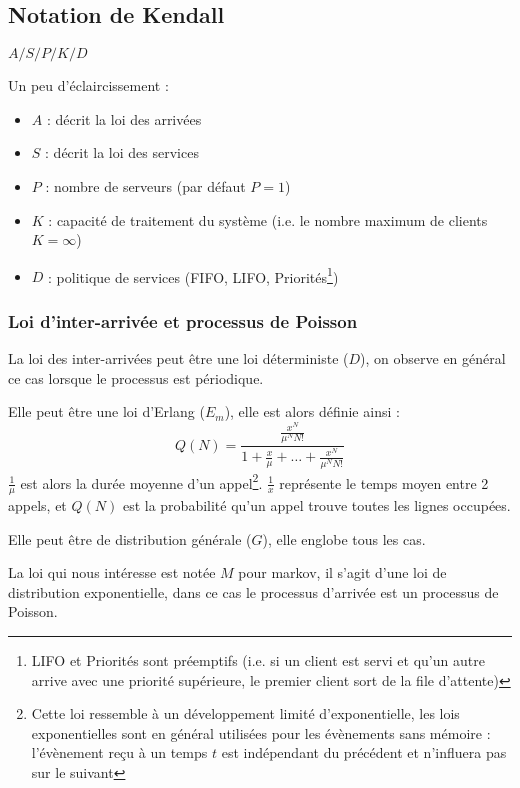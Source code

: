 \documentclass[a4paper, 11pt, fleqn]{article}
\newcommand{\inve}[1]{\frac{1}{#1}}
\begin{document}
\subsection{Notation de Kendall}

$A/S/P/K/D$

Un peu d'éclaircissement :
\begin{itemize}
	\item $A$ : décrit la loi des arrivées
	\item $S$ : décrit la loi des services
	\item $P$ : nombre de serveurs (par défaut $P=1$)
	\item $K$ : capacité de traitement du système (i.e. le nombre maximum de clients $K = \infty$)
	\item $D$ : politique de services (FIFO, LIFO, Priorités\footnote{LIFO et Priorités sont
			préemptifs (i.e. si un client est servi et qu'un autre arrive avec une priorité supérieure, le
		premier client sort de la file d'attente)})
\end{itemize}

\subsubsection{Loi d'inter-arrivée et processus de Poisson}

La loi des inter-arrivées peut être une loi déterministe ($D$), on observe en général ce cas lorsque le
processus est périodique. 

Elle peut être une loi d'Erlang ($E_m$), elle est alors définie ainsi :
$$ Q(N) = \frac{\frac{x^N}{\mu^N N!}}{1 + \frac{x}{\mu} + \dots + \frac{x^N}{\mu^N N!}} $$
$\inve{\mu}$ est alors la durée moyenne d'un appel\footnote{Cette loi ressemble à un développement
	limité d'exponentielle, les lois exponentielles sont en général utilisées pour les évènements sans
	mémoire : l'évènement reçu à un temps $t$ est indépendant du précédent et n'influera pas sur le
suivant}. $\inve{x}$ représente le temps moyen entre 2 appels, et $Q(N)$ est la probabilité qu'un
appel trouve toutes les lignes occupées. 

Elle peut être de distribution générale ($G$), elle englobe tous les cas.

La loi qui nous intéresse est notée $M$ pour markov, il s'agit d'une loi de distribution
exponentielle, dans ce cas le processus d'arrivée est un processus de Poisson.
\end{document}
